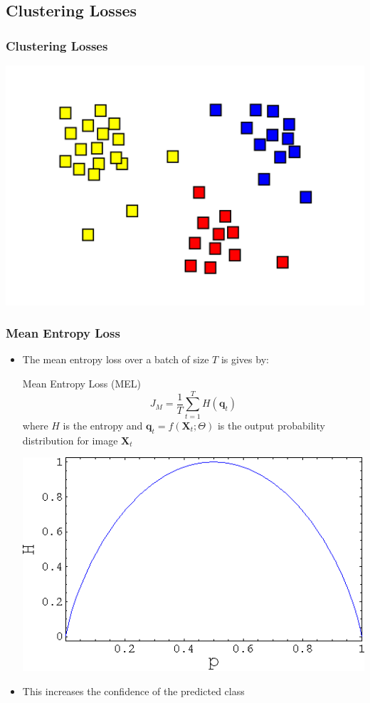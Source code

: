 \subsection{Clustering Losses}

\begin{frame}
	\frametitle{Clustering Losses}
	\includegraphics[scale=0.2, center]{images/clust1}
\end{frame}

\begin{frame}
	\frametitle{Mean Entropy Loss}
	\begin{itemize}
		\item The mean entropy loss over a batch of size $T$ is gives by:
			\begin{block}{Mean Entropy Loss (MEL)}
				\begin{equation*}
					J_M = \frac{1}{T}\sum_{t=1}^{T}H(\mathbf{q}_t)
				\end{equation*}
				where $H$ is the entropy and $\mathbf{q}_t = f(\mathbf{X}_t; \Theta)$ is the output
				probability distribution for image $\mathbf{X}_t$
			\end{block}
			\includegraphics[scale=0.18, center]{images/ent.png}
		\item This increases the confidence of the predicted class
	\end{itemize}
\end{frame}

